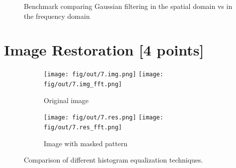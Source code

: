 \documentclass[tikz,14pt,fleqn]{article}
\begin{document}
\begin{figure}[h!]
    \centering
{}
\caption{Benchmark comparing Gaussian filtering in the spatial domain vs in the frequency domain}
\end{figure}



\section{Image Restoration [4 points]}

\begin{figure}[h!]
    \centering
    \begin{subfigure}{0.27\textwidth}
        \centering
        \texttt{[image: fig/out/7.img.png]}
        \texttt{[image: fig/out/7.img\_fft.png]}
        \caption{Original image}
    \end{subfigure}
    \begin{subfigure}{0.27\textwidth}
        \centering
        \texttt{[image: fig/out/7.res.png]}
        \texttt{[image: fig/out/7.res\_fft.png]}
        \caption{Image with masked pattern}
    \end{subfigure}
    \caption{Comparison of different histogram equalization techniques.}
\end{figure}
\end{document}
